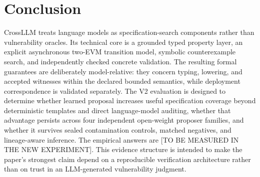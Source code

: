 \documentclass[journal]{IEEEtran}
\theoremstyle{definition}
\newcommand{\CrossTBD}{\textnormal{[TO BE MEASURED IN THE NEW EXPERIMENT]}}
\begin{document}
\section{Conclusion}
\label{sec:conclusion}

CrossLLM treats language models as specification-search components rather than vulnerability oracles. Its technical core is a grounded typed property layer, an explicit asynchronous two-EVM transition model, symbolic counterexample search, and independently checked concrete validation. The resulting formal guarantees are deliberately model-relative: they concern typing, lowering, and accepted witnesses within the declared bounded semantics, while deployment correspondence is validated separately. The V2 evaluation is designed to determine whether learned proposal increases useful specification coverage beyond deterministic templates and direct language-model auditing, whether that advantage persists across four independent open-weight proposer families, and whether it survives sealed contamination controls, matched negatives, and lineage-aware inference. The empirical answers are \CrossTBD. This evidence structure is intended to make the paper's strongest claim depend on a reproducible verification architecture rather than on trust in an LLM-generated vulnerability judgment.




\end{document}
